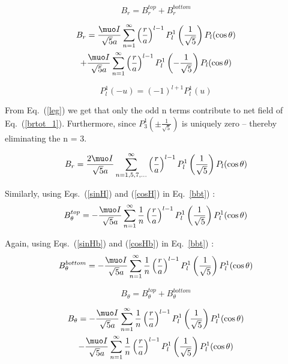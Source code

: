 \begin{equation}\label{brtot}
B_r=B_r^{top}+B_r^{bottom}
\end{equation}

\begin{multline}\label{brtot_1}
    B_r=\frac{\muo I }{\sqrt{5}a}\sum_{n=1}^{\infty} \left(\frac{r}{a}\right)^{l-1}P_l^1\left(\frac{1}{\sqrt{5}}\right) P_l(\cos\theta) \\+\frac{\muo I }{\sqrt{5}a}\sum_{n=1}^{\infty} \left(\frac{r}{a}\right)^{l-1}P_l^1\left(-\frac{1}{\sqrt{5}}\right) P_l(\cos\theta)
\end{multline}


\begin{equation}\label{leg}
P_l^1(-u)=(-1)^{l+1}P_l^1(u)
\end{equation}

From Eq.~(\ref{leg}) we get that only the odd n terms contribute to net field of Eq.~(\ref{brtot_1}). Furthermore, since \(P_3^1\left(\pm\frac{1}{\sqrt{5}}\right)\) is uniquely zero – thereby eliminating the n = 3.

\begin{equation}\label{brtotf}
B_r=\frac{2 \muo I }{\sqrt{5}a}\sum_{n=1,5,7,...}^{\infty} \left(\frac{r}{a}\right)^{l-1}P_l^1\left(\frac{1}{\sqrt{5}}\right) P_l(\cos\theta)
\end{equation}

Similarly, using Eqs.~(\ref{sinH}) and (\ref{cosH}) in Eq.~\ref{bbt}) :
\begin{equation}\label{bbtH}
B_\theta^{top}=-\frac{\muo I }{\sqrt{5}a}\sum_{n=1}^{\infty}\frac{1}{n} \left(\frac{r}{a}\right)^{l-1}P_l^1\left(\frac{1}{\sqrt{5}}\right) P_l^1(\cos\theta)
\end{equation}

Again, using Eqs.~(\ref{sinHb}) and (\ref{cosHb}) in Eq.~\ref{bbt}) :
\begin{equation}\label{bbtHb}
B_\theta^{bottom}=-\frac{\muo I }{\sqrt{5}a}\sum_{n=1}^{\infty}\frac{1}{n} \left(\frac{r}{a}\right)^{l-1}P_l^1\left(\frac{1}{\sqrt{5}}\right) P_l^1(\cos\theta)
\end{equation}

\begin{equation}\label{bttot}
B_\theta=B_\theta^{top}+B_\theta^{bottom}
\end{equation}

\begin{multline}\label{bttot_1}
    B_\theta=-\frac{\muo I }{\sqrt{5}a}\sum_{n=1}^{\infty}\frac{1}{n} \left(\frac{r}{a}\right)^{l-1}P_l^1\left(\frac{1}{\sqrt{5}}\right) P_l^1(\cos\theta) \\-\frac{\muo I }{\sqrt{5}a}\sum_{n=1}^{\infty}\frac{1}{n} \left(\frac{r}{a}\right)^{l-1}P_l^1\left(\frac{1}{\sqrt{5}}\right) P_l^1(\cos\theta)
\end{multline}



